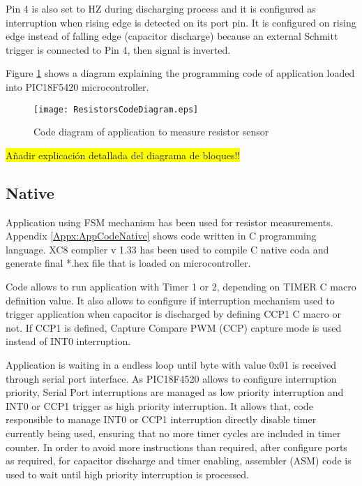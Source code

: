 Pin 4 is also set to HZ during discharging process and it is configured as interruption when rising edge is detected on its port pin. It is configured on rising edge instead of falling edge (capacitor discharge) because an external Schmitt trigger is connected to Pin 4, then signal is inverted.
\medskip

Figure \ref{fig:ResistorsCodeDiagram} shows a diagram explaining the programming code of application loaded into PIC18F5420 microcontroller.
\medskip

\begin{figure}[!ht]
\centering
\texttt{[image: ResistorsCodeDiagram.eps]}
\caption{Code diagram of application to measure resistor sensor}
\label{fig:ResistorsCodeDiagram}
\end{figure}

\colorbox{yellow}{Añadir explicación detallada del diagrama de bloques!!}

\subsection{Native}\label{SS:Res:Code:Native}
Application using FSM mechanism has been used for resistor measurements. Appendix \ref{Appx:AppCodeNative} shows code written in C programming language. XC8 complier v 1.33 has been used to compile C native coda and generate final *.hex file that is loaded on microcontroller.

Code allows to run application with Timer 1 or 2, depending on TIMER C macro definition value. It also allows to configure if interruption mechanism used to trigger application when capacitor is discharged by defining CCP1 C macro or not. If CCP1 is defined, Capture Compare PWM (CCP) capture mode is used instead of INT0 interruption.

Application is waiting in a endless loop until byte with value 0x01 is received through serial port interface. As PIC18F4520 allows to configure interruption priority, Serial Port interruptions are managed as low priority interruption and INT0 or CCP1 trigger as high priority interruption. It allows that, code responsible to manage INT0 or CCP1 interruption directly disable timer currently being used, ensuring that no more timer cycles are included in timer counter. In order to avoid more instructions than required, after configure ports as required, for capacitor discharge and timer enabling, assembler (ASM) code is used to wait until high priority interruption is processed.

